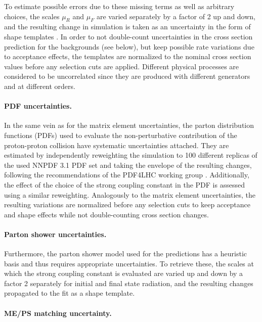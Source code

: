 To estimate possible errors due to these missing terms as well as arbitrary choices, the scales $\mu_R$ and $\mu_F$ are varied separately by a factor of 2 up and down, and the resulting change in simulation is taken as an uncertainty in the form of shape templates \cite{Cacciari:2004}. In order to not double-count uncertainties in the cross section prediction for the backgrounds (see below), but keep possible rate variations due to acceptance effects, the templates are normalized to the nominal cross section values before any selection cuts are applied. Different physical processes are considered to be uncorrelated since they are produced with different generators and at different orders. 

\paragraph{PDF uncertainties.}

In the same vein as for the matrix element uncertainties, the parton distribution functions (PDFs) used to evaluate the non-perturbative contribution of the proton-proton collision have systematic uncertainties attached. They are estimated by independently reweighting the simulation to 100 different replicas of the used NNPDF 3.1 PDF set and taking the envelope of the resulting changes, following the recommendations of the PDF4LHC working group \cite{Butterworth:2015oua}. Additionally, the effect of the choice of the strong coupling constant in the PDF is assessed using a similar reweighting. Analogously to the matrix element uncertainties, the resulting variations are normalized before any selection cuts to keep acceptance and shape effects while not double-counting cross section changes.

\paragraph{Parton shower uncertainties.}

Furthermore, the parton shower model used for the predictions has a heuristic basis and thus requires appropriate uncertainties. To retrieve these, the scales at which the strong coupling constant is evaluated are varied up and down by a factor 2 separately for initial and final state radiation, and the resulting changes propagated to the fit as a shape template.

\paragraph{ME/PS matching uncertainty.}

